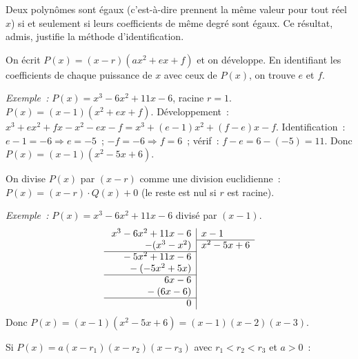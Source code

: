 \begin{prop}
Deux polyn\^omes sont \'egaux (c'est-\`a-dire prennent la m\^eme valeur pour
tout r\'eel $x$) si et seulement si leurs coefficients de m\^eme degr\'e sont
\'egaux. Ce r\'esultat, admis, justifie la m\'ethode d'identification.
\end{prop}

\begin{methode}
On \'ecrit $P(x) = (x-r)(ax^2+ex+f)$ et on d\'eveloppe.
En identifiant les coefficients de chaque puissance de $x$ avec ceux de $P(x)$,
on trouve $e$ et $f$.

\emph{Exemple~:} $P(x) = x^3 - 6x^2 + 11x - 6$, racine $r=1$.
$P(x) = (x-1)(x^2+ex+f)$.
D\'eveloppement~: $x^3 + ex^2 + fx - x^2 - ex - f
= x^3 + (e-1)x^2 + (f-e)x - f$.
Identification~: $e-1 = -6 \Rightarrow e=-5$~;
$-f = -6 \Rightarrow f=6$~; v\'erif~: $f-e = 6-(-5)=11$.\checkmark
Donc $P(x) = (x-1)(x^2-5x+6)$.
\end{methode}

\begin{methode}
On divise $P(x)$ par $(x-r)$ comme une division euclidienne~:
$P(x) = (x-r)\cdot Q(x) + 0$ (le reste est nul si $r$ est racine).

\emph{Exemple~:} $P(x) = x^3 - 6x^2 + 11x - 6$ divis\'e par $(x-1)$.
\[
\begin{array}{r|l}
x^3-6x^2+11x-6 & x-1\\
\cline{2-2}
-(x^3-x^2) & x^2-5x+6\\
\cline{1-1}
\phantom{x^3{}}-5x^2+11x-6 & \\
\phantom{x^3{}}-(-5x^2+5x) & \\
\cline{1-1}
\phantom{x^3-6x^2{}}6x-6 & \\
\phantom{x^3-6x^2{}}-(6x-6) & \\
\cline{1-1}
\phantom{x^3-6x^2+11x{}}0 &
\end{array}
\]
Donc $P(x) = (x-1)(x^2-5x+6) = (x-1)(x-2)(x-3)$.
\end{methode}

\begin{prop}
Si $P(x) = a(x-r_1)(x-r_2)(x-r_3)$ avec $r_1 < r_2 < r_3$ et $a>0$~:
\begin{center}
\end{center}
\end{prop}

